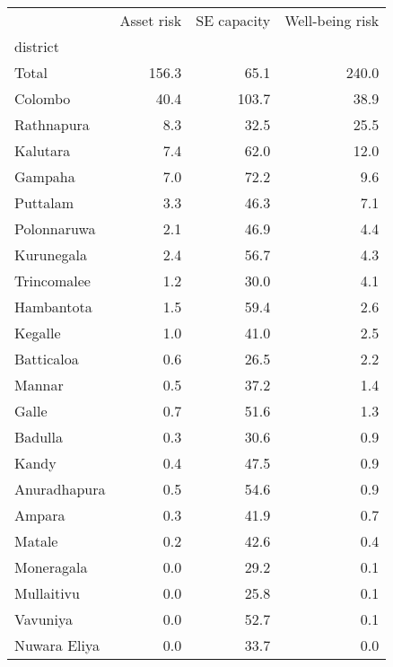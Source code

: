 \begin{tabular}{lrrr}
\toprule
{} &  Asset risk &  SE capacity &  Well-being risk \\
district     &             &              &                  \\
\midrule
Total        &       156.3 &         65.1 &            240.0 \\
Colombo      &        40.4 &        103.7 &             38.9 \\
Rathnapura   &         8.3 &         32.5 &             25.5 \\
Kalutara     &         7.4 &         62.0 &             12.0 \\
Gampaha      &         7.0 &         72.2 &              9.6 \\
Puttalam     &         3.3 &         46.3 &              7.1 \\
Polonnaruwa  &         2.1 &         46.9 &              4.4 \\
Kurunegala   &         2.4 &         56.7 &              4.3 \\
Trincomalee  &         1.2 &         30.0 &              4.1 \\
Hambantota   &         1.5 &         59.4 &              2.6 \\
Kegalle      &         1.0 &         41.0 &              2.5 \\
Batticaloa   &         0.6 &         26.5 &              2.2 \\
Mannar       &         0.5 &         37.2 &              1.4 \\
Galle        &         0.7 &         51.6 &              1.3 \\
Badulla      &         0.3 &         30.6 &              0.9 \\
Kandy        &         0.4 &         47.5 &              0.9 \\
Anuradhapura &         0.5 &         54.6 &              0.9 \\
Ampara       &         0.3 &         41.9 &              0.7 \\
Matale       &         0.2 &         42.6 &              0.4 \\
Moneragala   &         0.0 &         29.2 &              0.1 \\
Mullaitivu   &         0.0 &         25.8 &              0.1 \\
Vavuniya     &         0.0 &         52.7 &              0.1 \\
Nuwara Eliya &         0.0 &         33.7 &              0.0 \\
\bottomrule
\end{tabular}
